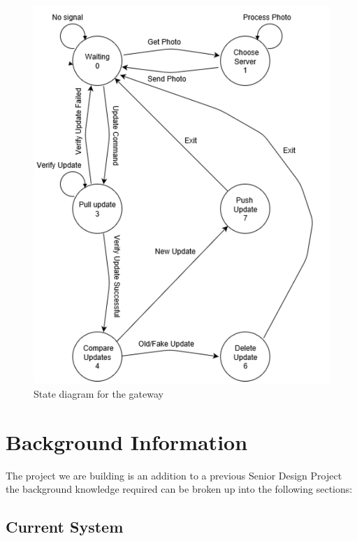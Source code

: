\documentclass[11pt]{article}
\begin{document}
\begin{figure}[!ht]
\centering
\includegraphics[scale = 0.35]{gatewaystate.png}
\caption{State diagram for the gateway}
\end{figure}

\FloatBarrier

\section{Background Information}

The project we are building is an addition to a previous Senior Design Project the background knowledge required can be broken up into the following sections:

\subsection{Current System}
\end{document}
